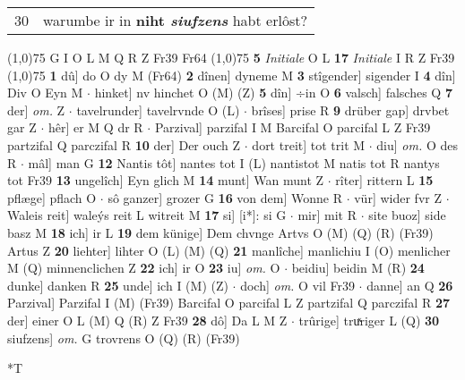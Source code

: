 \documentclass[8pt,a4paper,notitlepage]{article}
\begin{document}
\begin{table}[ht]
\begin{minipage}[t]{0.5\linewidth}
\begin{tabular}{rl}
30 & warumbe ir in \textbf{niht \textit{siufzens}} habt erlôst?\\ 
\end{tabular}
\scriptsize
\line(1,0){75} \newline
G I O L M Q R Z Fr39 Fr64 \newline
\line(1,0){75} \newline
\textbf{5} \textit{Initiale} O L  \textbf{17} \textit{Initiale} I R Z Fr39  \newline
\line(1,0){75} \newline
\textbf{1} dû] do O dy M (Fr64) \textbf{2} dînen] dyneme M \textbf{3} stîgender] sigender I \textbf{4} dîn] Div O Eyn M  $\cdot$ hinket] nv hinchet O (M) (Z) \textbf{5} dîn] ÷in O \textbf{6} valsch] falsches Q \textbf{7} der] \textit{om.} Z  $\cdot$ tavelrunder] tavelrvnde O (L)  $\cdot$ brîses] prise R \textbf{9} drüber gap] drvbet gar Z  $\cdot$ hêr] er M Q dr R  $\cdot$ Parzival] parzifal I M Barcifal O parcifal L Z Fr39 partzifal Q parczifal R \textbf{10} der] Der ouch Z  $\cdot$ dort treit] tot trit M  $\cdot$ diu] \textit{om.} O des R  $\cdot$ mâl] man G \textbf{12} Nantis tôt] nantes tot I (L) nantistot M natis tot R nantys tot Fr39 \textbf{13} ungelîch] Eyn glich M \textbf{14} munt] Wan munt Z  $\cdot$ rîter] rittern L \textbf{15} pflæge] pflach O  $\cdot$ sô ganzer] grozer G \textbf{16} von dem] Wonne R  $\cdot$ vür] wider fvr Z  $\cdot$ Waleis reit] waleýs reit L witreit M \textbf{17} si] [i*]: si G  $\cdot$ mir] mit R  $\cdot$ site buoz] side basz M \textbf{18} ich] ir L \textbf{19} dem künige] Dem chvnge Artvs O (M) (Q) (R) (Fr39) Artus Z \textbf{20} liehter] lihter O (L) (M) (Q) \textbf{21} manlîche] manlichiu I (O) menlicher M (Q) minnenclichen Z \textbf{22} ich] ir O \textbf{23} iu] \textit{om.} O  $\cdot$ beidiu] beidin M (R) \textbf{24} dunke] danken R \textbf{25} unde] ich I (M) (Z)  $\cdot$ doch] \textit{om.} O vil Fr39  $\cdot$ danne] an Q \textbf{26} Parzival] Parzifal I (M) (Fr39) Barcifal O parcifal L Z partzifal Q parczifal R \textbf{27} der] einer O L (M) Q (R) Z Fr39 \textbf{28} dô] Da L M Z  $\cdot$ trûrige] truͯriger L (Q) \textbf{30} siufzens] \textit{om.} G trovrens O (Q) (R) (Fr39) \newline
\end{minipage}
\hspace{0.5cm}
\begin{minipage}[t]{0.5\linewidth}
\small
\begin{center}*T
\end{center}
\begin{tabular}{rl}

\end{tabular}
\end{minipage}
\end{table}
\end{document}
